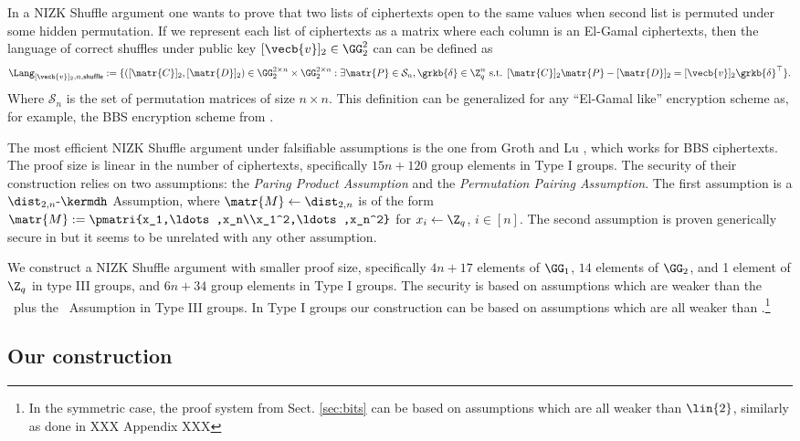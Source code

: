 In a NIZK Shuffle argument one wants to prove that two lists of ciphertexts open to the same values when second list is permuted under some hidden permutation.
If we represent each list of ciphertexts as a matrix where each column is an El-Gamal ciphertexts, then the language of correct shuffles under public key $[\vecb{v}]_2\in\GG^2_2$ can can be defined as 
$$
\Lang_{[\vecb{v}]_2,n,\mathsf{shuffle}}:=\{([\matr{C}]_2,[\matr{D}]_2)\in\GG_2^{2\times n}\times \GG_2^{2\times n} : \exists \matr{P}\in\mathcal{S}_n,\grkb{\delta}\in\Z_q^n \text{ s.t. } [\matr{C}]_2\matr{P}-[\matr{D}]_2 = [\vecb{v}]_2\grkb{\delta}^\top\}.$$
Where $\mathcal{S}_n$ is the set of permutation matrices of size $n\times n$. This definition can be generalized for any ``El-Gamal like'' encryption scheme as, for example, the BBS encryption scheme from \cite{C:BonBoySha04}.

The most efficient NIZK Shuffle argument under falsifiable assumptions is the one from Groth and Lu \cite{AC:GroLu07}, which works for BBS ciphertexts. The proof size is linear in the number of ciphertexts, specifically $15n + 120$ group elements in Type I groups. The security of their construction relies on two assumptions: the \emph{Paring Product Assumption} and the \emph{Permutation Pairing Assumption}. The first assumption is a $\dist_{2,n}\mbox{-}\kermdh$ Assumption, where $\matr{M}\gets\dist_{2,n}$ is of the form $\matr{M}:=\pmatri{x_1,\ldots,x_n\\x_1^2,\ldots,x_n^2}$ for $x_i\gets\Z_q$, $i\in[n]$. The second assumption is proven generically secure in \cite{AC:GroLu07} but it seems to be unrelated with any other assumption.

We construct a NIZK Shuffle argument with smaller proof size, specifically $4n+17$ elements of $\GG_1$, $14$ elements of $\GG_2$, and 1 element of $\Z_q$ in type III groups, and $6n+34$ group elements in Type I groups. The security is based on assumptions which are weaker than the \ddh~plus the \SSDP~Assumption in  Type III groups. In Type I groups our construction can be based on assumptions which are all weaker than .\footnote{In the symmetric case, the proof system from Sect. \ref{sec:bits} can be based on assumptions which are all weaker than $\lin{2}$, similarly as done in XXX Appendix XXX}
 
\subsection{Our construction}

